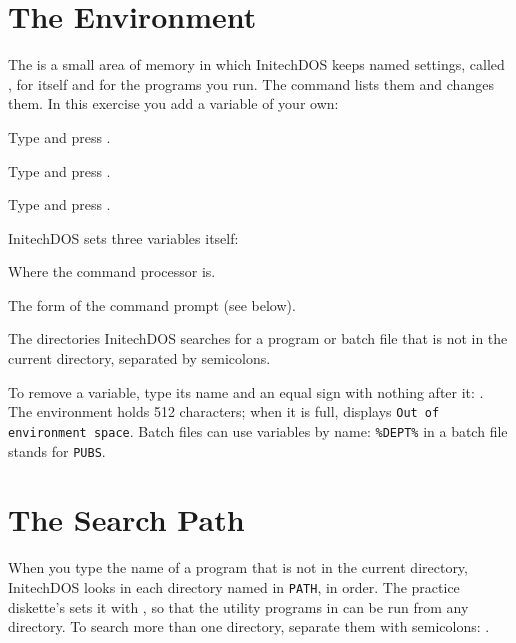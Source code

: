 \section{The Environment}
The  is a small area of memory in which InitechDOS keeps
named settings, called , for itself and for the
programs you run.  The  command lists them and changes them.  In
this exercise you add a variable of your own:
\begin{Steps}
\item Type  and press .
\item Type  and press .
\item Type  and press .
\end{Steps}


InitechDOS sets three variables itself:

Where the command processor is.

The form of the command prompt (see below).

The directories InitechDOS searches for a program or batch
file that is not in the current directory, separated by semicolons.

To remove a variable, type its name and an equal sign with nothing after
it: .  The environment holds 512 characters; when it is
full,  displays \texttt{Out of environment space}.  Batch files can
use variables by name: \texttt{\%DEPT\%} in a batch file stands for
\texttt{PUBS}.

\section{The Search Path}
When you type the name of a program that is not in the current directory,
InitechDOS looks in each directory named in \texttt{PATH}, in order.  The
practice diskette's  sets it with
, so that the utility programs in 
can be run from any directory.  To search more than one directory, separate
them with semicolons: .

